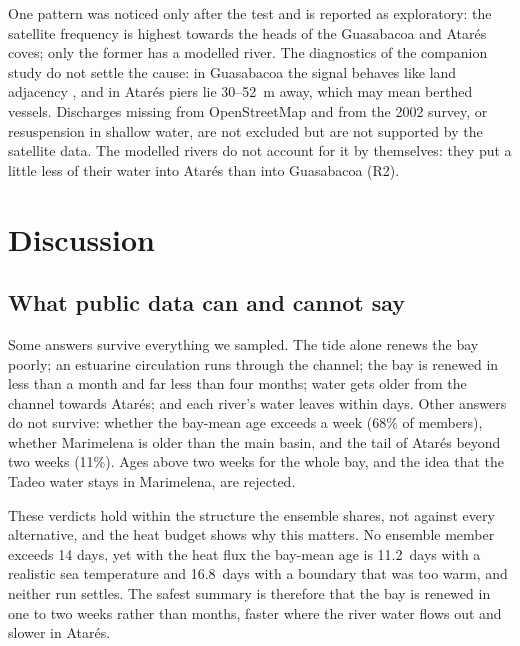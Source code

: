 \documentclass[a4paper,fleqn]{ems-dc}
\begin{document}
One pattern was noticed only after the test and is reported as exploratory: the satellite
frequency is highest towards the heads of the Guasabacoa and Atar\'es coves; only the former
has a modelled river. The diagnostics of the companion study do not settle the cause: in
Guasabacoa the signal behaves like land adjacency \citep{Sterckx2011}, and in Atar\'es piers lie 30--52~m away,
which may mean berthed vessels. Discharges missing from OpenStreetMap and from the 2002
survey, or resuspension in shallow water, are not excluded but are not supported by the
satellite data. The modelled rivers do not account for it by themselves: they put a little
less of their water into Atar\'es than into Guasabacoa (R2).

\section{Discussion}\label{sec:discussion}
\subsection{What public data can and cannot say}
Some answers survive everything we sampled. The tide alone renews the bay poorly; an
estuarine circulation runs through the channel; the bay is renewed in less than a month and
far less than four months; water gets older from the channel towards Atar\'es; and each
river's water leaves within days. Other answers do not survive: whether the bay-mean age
exceeds a week (68\% of members), whether Marimelena is older than the main basin, and the
tail of Atar\'es beyond two weeks (11\%). Ages above two weeks for the whole bay, and the idea
that the Tadeo water stays in Marimelena, are rejected.

These verdicts hold within the structure the ensemble shares, not against every
alternative, and the heat budget shows why this matters. No ensemble member exceeds 14 days,
yet with the heat flux the bay-mean age is 11.2~days with a realistic sea temperature and
16.8~days with a boundary that was too warm, and neither run settles. The safest summary is
therefore that the bay is renewed in one to two weeks rather than months, faster where the
river water flows out and slower in Atar\'es.
\end{document}
